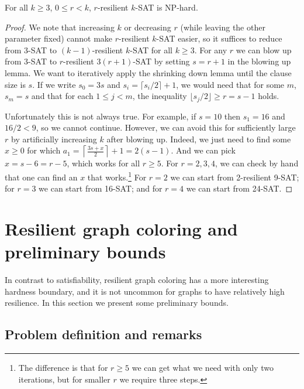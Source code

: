 \begin{theorem}

For all $k \geq 3$, $0 \leq r < k$, $r$-resilient $k$-SAT is NP-hard.

\end{theorem}
\begin{proof}

We note that increasing $k$ or decreasing $r$ (while leaving the other
parameter fixed) cannot make $r$-resilient $k$-SAT easier, so it suffices to
reduce from 3-SAT to $(k-1)$-resilient $k$-SAT for all $k \geq 3$. For any $r$
we can blow up from 3-SAT to $r$-resilient $3(r+1)$-SAT by setting $s = r+1$ in
the blowing up lemma. We want to iteratively apply the shrinking down lemma
until the clause size is $s$. If we write $s_0 = 3s$ and $s_i = \lceil s_i/2
\rceil + 1$, we would need that for some $m$, $s_m = s$ and that for each $1
\leq j < m$, the inequality $\lfloor s_j / 2 \rfloor \geq r = s-1$ holds.

Unfortunately this is not always true. For example, if $s = 10$ then $s_1 =
16$ and $16/2 < 9$, so we cannot continue. However, we can avoid this for
sufficiently large $r$ by artificially increasing $k$ after blowing up. Indeed,
we just need to find some $x \geq 0$ for which
$
   a_1 = \left \lceil \frac{3s+x}{2} \right \rceil + 1 = 2(s-1).
$
And we can pick $x = s - 6 = r - 5$, which works for all $r \geq 5$. For $r =
2,3,4$, we can check by hand that one can find an $x$ that works.\footnote{The
difference is that for $r \geq 5$ we can get what we need with only two
iterations, but for smaller $r$ we require three steps.} For $r=2$ we can
start from 2-resilient 9-SAT; for $r=3$ we can start from 16-SAT; and for $r=4$
we can start from 24-SAT.
\end{proof}

\section{Resilient graph coloring and preliminary bounds}
\label{sec:resilient-coloring-observation-bounds}

In contrast to satisfiability, resilient graph coloring has a more interesting
hardness boundary, and it is not uncommon for graphs to have relatively high
resilience. In this section we present some preliminary bounds.

\subsection{Problem definition and remarks}

